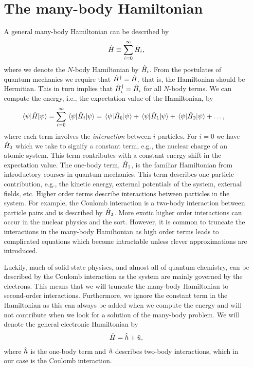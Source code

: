     \section{The many-body Hamiltonian}
        A general many-body Hamiltonian can be described by
        \begin{align}
            \hat{H} \equiv \sum_{i = 0}^{\infty} \hat{H}_i,
        \end{align}
        where we denote the $N$-body Hamiltonian by $\hat{H}_i$.
        From the postulates of quantum mechanics we require that
        $\hat{H}^{\dagger} = \hat{H}$, that is, the Hamiltonian should be
        Hermitian.
        This in turn implies that $\hat{H}_i^{\dagger} = \hat{H}_i$ for all
        $N$-body terms.
        We can compute the energy, i.e., the expectation value of the
        Hamiltonian, by
        \begin{align}
            \mel{\psi}{\hat{H}}{\psi}
            &= \sum_{i = 0}^{\infty} \mel{\psi}{\hat{H}_i}{\psi}
            = \mel{\psi}{\hat{H}_0}{\psi}
            + \mel{\psi}{\hat{H}_1}{\psi}
            + \mel{\psi}{\hat{H}_2}{\psi}
            + \dots,
        \end{align}
        where each term involves the \emph{interaction} between $i$ particles.
        For $i = 0$ we have $\hat{H}_0$ which we take to signify a constant term,
        e.g., the nuclear charge of an atomic system.
        This term contributes with a constant energy shift in the expectation
        value.
        The one-body term, $\hat{H}_1$, is the familiar Hamiltonian from
        introductory courses in quantum mechanics.
        This term describes one-particle contribution, e.g., the kinetic
        energy, external potentials of the system, external fields, etc.
        Higher order terms describe interactions between particles in the
        system.
        For example, the Coulomb interaction is a two-body interaction between
        particle pairs and is described by $\hat{H}_2$.
        More exotic higher order interactions can occur in the nuclear physics
        and the sort.
        However, it is common to truncate the interactions in the many-body
        Hamiltonian as high order terms leads to complicated equations which
        become intractable unless clever approximations are introduced.

        Luckily, much of solid-state physiscs, and almost all of quantum
        chemistry, can be described by the Coulomb interaction as the system are
        mainly governed by the electrons.
        This means that we will truncate the many-body Hamiltonian to
        second-order interactions.
        Furthermore, we ignore the constant term in the Hamiltonian as this can
        always be added when we compute the energy and will not contribute when
        we look for a solution of the many-body problem.
        We will denote the general electronic Hamiltonian by
        \begin{align}
            \hat{H} = \hat{h} + \hat{u},
        \end{align}
        where $\hat{h}$ is the one-body term and $\hat{u}$ describes
        two-body interactions, which in our case is the Coulomb interaction.

